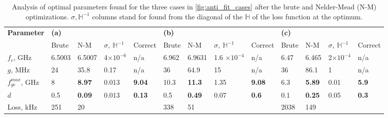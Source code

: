 \documentclass[%
 aip,
 draft,
 amsmath,amssymb,
 reprint,%
]{revtex4-1}
\begin{document}
\begin{table}
	\centering
	\begin{ruledtabular}
		\renewcommand{\arraystretch}{1.2}

		\begin{tabular}{*{13}{l}} 
			\multirow{2}{*}{\textbf{Parameter}} & 
			\multicolumn{4}{l}{\textbf{(a)}} & 
			\multicolumn{4}{l}{\textbf{(b)}} & \multicolumn{4}{l}{\textbf{(c)}}\\
			& Brute & N-M & $\sigma,\ \mathbb{H}^{-1}$ & Correct  & Brute & N-M & $\sigma,\ \mathbb{H}^{-1}$ & Correct  & Brute& N-M & $\sigma,\ \mathbb{H}^{-1}$ & Correct  \\
			\hline
			$f_c$, GHz &6.5003 & 6.5007 &  4$\times 10^{-6}$ & n/a & 6.962 & 6.9631 & 1.6 $\times 10^{-4}$  & n/a &  6.47 & 6.465& 2$\times 10^{-4}$ & n/a\\ 
			$g$, MHz & 24 & 35.8 & 0.17 & n/a & 36 & 64.9 & 15 & n/a & 36 & 86.1& 1 &n/a\\
			$f_{ge}^{max}$, GHz & 8 &\textbf{8.97} & 0.013 & \textbf{9.04} &10.3& \textbf{11.3}& 1.35 & \textbf{9.08}& 6.3& \textbf{5.89}&0.01&\textbf{5.9}\\
			$d$ &0.5& \textbf{0.09}& 0.013& \textbf{0.13} &0.5&\textbf{0.49} &0.07&\textbf{0.6}&0.1& \textbf{0.25} & 0.05 &\textbf{0.3} \\\hline
			Loss, kHz & 251 & 20 && &338& 51 & & &2038& 149&&
		\end{tabular} 
	\end{ruledtabular}
	\caption{Analysis of optimal parameters found for the three cases in \autoref{fig:anti_fit_cases} after the brute and Nelder-Mead (N-M) optimizations. $\sigma, \mathbb{H}^{-1}$ columns stand for  found from the diagonal of the  $\mathbb{H}$ of the loss function at the optimum.}
	\label{tab:sts_results}
\end{table}
\end{document}

